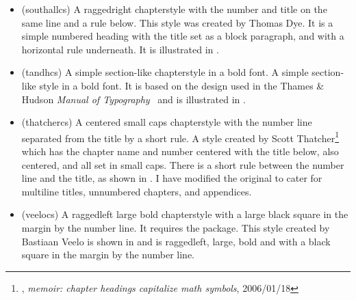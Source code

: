 \begin{itemize}


\item[\cstyle{southall}]
\glossary(southallcs)%
  {}%
  { A raggedright chapterstyle with the number and title on the same line
   and a rule below.}
  This style was created by Thomas Dye. It
  is a simple numbered heading with the title set as a block
  paragraph, and with a horizontal rule underneath. It is illustrated
  in .


\item[\cstyle{tandh}]
\glossary(tandhcs)%
  {}%
  {A simple section-like chapterstyle in a bold font.}
A simple section-like style in a bold font. It is based on the design used in
the Thames \& Hudson \textit{Manual of Typography}~\cite{MCLEAN80} and
is illustrated in
.



\item[\cstyle{thatcher}]
\glossary(thatchercs)%
  {}%
  {A centered small caps chapterstyle with the number line separated from
   the title by a short rule.}
A style created by
  Scott Thatcher\footnote{\ctt,
  \textit{memoir: chapter headings capitalize math symbols}, 2006/01/18}
  which has the chapter name and number centered with the
  title below, also centered, and all set in small caps. There is a short rule
  between the number line and the title, as shown in .
  I have modified the original to
  cater for multiline titles, unnumbered chapters, and appendices.




\item[\cstyle{veelo}]
\glossary(veelocs)%
  {}%
  {A raggedleft large bold chapterstyle with a large black square
   in the margin by the number line. It requires the  package.}
   This style created by Bastiaan Veelo
  is shown in  and is raggedleft, large, bold and with a
  black square in the margin by the number line.


\end{itemize}
